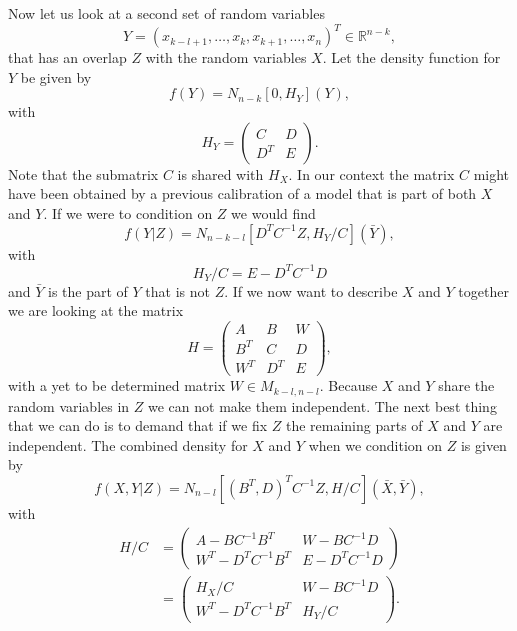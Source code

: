 \documentclass[11pt, a4paper]{article}
\newcommand{\R}{\mathbb{R}}
\begin{document}
Now let us look at a second set of random variables 
\begin{equation}
	Y = (x_{k-l+1}, \ldots, x_k, x_{k+1}, \ldots, x_n)^T \in \R^{n-k},
\end{equation}
that has an overlap $Z$ with the random variables $X$. Let the density function for $Y$ be given by
\begin{equation}
	f(Y) = N_{n-k}[0,H_Y] ( Y),
\end{equation}
with
\begin{equation}
	H_Y = \begin{pmatrix}
		C & D \\
		D^T & E
	\end{pmatrix}.
\end{equation}
Note that the submatrix $C$ is shared with $H_X$. In our context the matrix $C$ might have been obtained by a previous calibration of a model that is part of both $X$ and $Y$. If we were to condition on $Z$ we would find
\begin{equation}
	f(Y\vert Z) = N_{n-k-l}[ D^T C^{-1}Z,H_Y/C](\bar Y), 
\end{equation}
with
\begin{equation}\label{eqn.hyc}
	H_Y/C = E - D^TC^{-1}D
\end{equation}
and $\bar Y$ is the part of $Y$ that is not $Z$. If we now want to describe $X$ and $Y$ together we are looking at the matrix
\begin{equation}
	H = \begin{pmatrix}
		A & B & W \\
		B^T & C & D \\
		W^T & D^T & E
	\end{pmatrix},
\end{equation}
with a yet to be determined matrix $W\in M_{k-l,n-l}$. Because $X$ and $Y$ share the random variables in $Z$ we can not make them independent. The next best thing that we can do is to demand that if we fix $Z$ the remaining parts of $X$ and $Y$ are independent. The combined density for $X$ and $Y$ when we condition on $Z$ is given by
\begin{equation}
	f( X,Y\vert Z) = N_{n-l}[ (B^T,D)^TC^{-1}Z, H/C](\bar X, \bar Y),
\end{equation}
with
\begin{align}
	H/C & = \begin{pmatrix}
		A - B C^{-1}B^T & W - B C^{-1} D \\
		W^T - D^TC^{-1}B^T & E - D^TC^{-1}D
	\end{pmatrix}\\
  & = \begin{pmatrix}
		H_X/C & W - B C^{-1} D \\
		W^T - D^TC^{-1}B^T & H_Y/C
	\end{pmatrix}.
\end{align}
\end{document}
